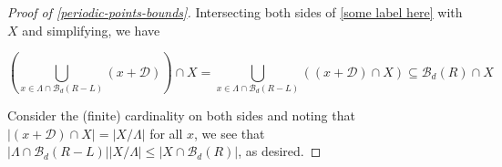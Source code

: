 \begin{proof}[Proof of \cref{periodic-points-bounds}]\label{periodic-points-bounds-proof}
  Intersecting both sides of \ref{some label here} with $X$ and simplifying, we have

  \[
    \left(\bigcup_{x \in \Lambda \cap \mathcal{B}_d(R - L)} (x + \mathcal{D})\right) \cap X = \bigcup_{x \in \Lambda \cap \mathcal{B}_d(R - L)} ((x + \mathcal{D}) \cap X) \subseteq \mathcal{B}_d(R) \cap X
  \]

  Consider the (finite) cardinality on both sides and noting that $|(x + \mathcal{D}) \cap X| = |X / \Lambda|$ for all $x$, we see that $|\Lambda \cap \mathcal{B}_d(R - L)||X / \Lambda| \leq |X \cap \mathcal{B}_d(R)|$, as desired.

\end{proof}
